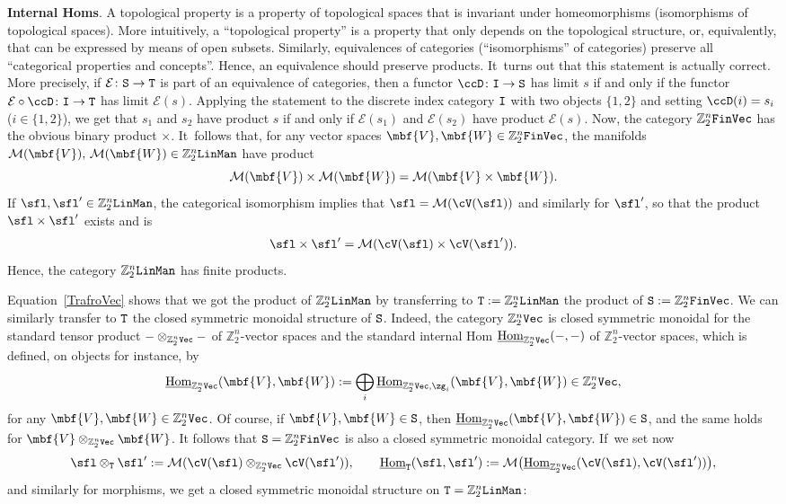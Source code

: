 \documentclass[pdftex]{sigma}%
\newcommand{\op}[1]{\operatorname{#1}}
\newcommand{\Z}{{\mathbb Z}}
\def\ul{\underline}
\def\cM{\cal M}
\def\cE{\mathcal{E}}
\def\cM{\mathcal{M}}
\def\ul{\underline}
\newcommand{\0}{\otimes}
\newcommand{\z}{\Z_2^n}
\numberwithin{equation}{section}
\begin{document}
\noindent
{\bf Internal Homs}. A topological property is a property of topological spaces that is invariant under homeomorphisms (isomorphisms of topological spaces). More intuitively, a ``topological property'' is a property that only depends on the topological structure, or, equivalently, that can be expressed by means of open subsets. Similarly, equivalences of categories (``isomorphisms'' of categories) preserve all ``categorical properties and concepts''. Hence, an equivalence should preserve products. It~turns out that this statement is actually correct. More precisely, if $\cE\colon {\tt S}\to {\tt T}$ is part of an equivalence of categories, then a functor $\ccD\colon {\tt I}\to{\tt S}$ has limit $s$ if and only if the functor $\cE\circ\ccD\colon {\tt I}\to {\tt T}$ has limit $\cE(s)$. Applying the statement to the discrete index category ${\tt I}$ with two objects $\{1,2\}$ and setting $\ccD(i)=s_i$ ($i\in\{1,2\}$), we get that $s_1$ and $s_2$ have product $s$ if and only if $\cE(s_1)$ and $\cE(s_2)$ have product $\cE(s)$. Now, the category $\z{\tt FinVec}$ has the obvious binary product $\times$. It~follows that, for any vector spaces $\mbf{V},\mbf{W}\in\z{\tt FinVec}$, the manifolds $\cM(\mbf{V}),\, \cM(\mbf{W})\in\z{\tt LinMan}$ have product
\[
\cM(\mbf{V})\times\cM(\mbf{W})=\cM(\mbf{V}\times\mbf{W}).
\]
If $\sfl,\sfl'\in\z{\tt LinMan}$, the categorical isomorphism implies that $\sfl=\cM(\cV(\sfl))$ and similarly for $\sfl'$, so that the product $\sfl\times\sfl'$ exists and is
\begin{gather}\label{TrafroVec}
\sfl\times\sfl'=\cM(\cV(\sfl)\times\cV(\sfl')).
\end{gather}
Hence, the category $\z{\tt LinMan}$ has finite products.

Equation~\eqref{TrafroVec} shows that we got the product of $\z{\tt LinMan}$ by transferring to ${\tt T}:=\z{\tt LinMan}$ the product of ${\tt S}:=\z{\tt FinVec}$. We can similarly transfer to ${\tt T}$ the closed symmetric monoidal structure of ${\tt S}$. Indeed, the category $\z{\tt Vec}$ is closed symmetric monoidal for the standard tensor product $-\0_{\z\tt Vec}-$ of $\z$-vector spaces and the standard internal Hom $\ul{\text{Hom}}_{\z\tt Vec}(-,-)$ of $\z$-vector spaces, which is defined, on objects for instance, by
\begin{gather*}%
\ul{\text{Hom}}_{\z\tt Vec}(\mbf{V},\mbf{W}):=\bigoplus_i\ul{\text{Hom}}_{\z{\tt Vec}
,\zg_i}(\mbf{V},\mbf{W})\in\z{\tt Vec},
\end{gather*}
for any $\mbf{V},\mbf{W}\in\z\tt Vec$. Of course, if $\mbf{V},\mbf{W}\in\tt S$, then $\ul{\text{Hom}}_{\z\tt Vec}(\mbf{V},\mbf{W})\in\tt S$, and the same holds for $\mbf{V}\0_{\z\tt Vec}\mbf{W}$. It follows that ${\tt S}=\z{\tt FinVec}$ is also a closed symmetric monoidal category. If~we set now
\begin{gather}\label{CMSLinMan}
\sfl\0_{\tt T}\sfl':=\cM(\cV(\sfl)\0_{\z\tt Vec}\cV(\sfl')),\qquad \ul{\op{Hom}}_{\tt T}(\sfl,\sfl'):=\cM\big(\ul{\op{Hom}}_{\z{\tt Vec}}(\cV(\sfl),\cV(\sfl'))\big),
\end{gather}
and similarly for morphisms, we get a closed symmetric monoidal structure on ${\tt T}=\z{\tt LinMan}$:
\end{document}
